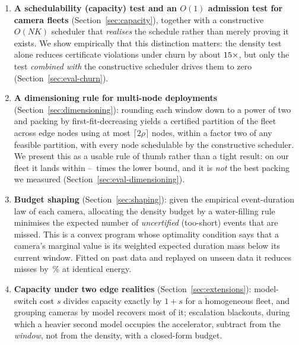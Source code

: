 \documentclass[final,5p,times,twocolumn]{elsarticle}
\theoremstyle{definition}
\newcommand{\Nc}{N}
\newcommand{\dens}{\rho}
\begin{document}
\begin{enumerate}
\item \textbf{A schedulability (capacity) test and an $O(1)$ admission test for camera fleets}
      (Section~\ref{sec:capacity}), together with a constructive $O(\Nc K)$ scheduler that
      \emph{realises} the schedule rather than merely proving it exists. We show empirically that
      this distinction matters: the density test alone reduces certificate violations under churn
      by about $15\times$, but only the test \emph{combined with} the constructive
      scheduler drives them to zero (Section~\ref{sec:eval-churn}).
\item \textbf{A dimensioning rule for multi-node deployments} (Section~\ref{sec:dimensioning}):
      rounding each window down to a power of two and packing by first-fit-decreasing yields a
      certified partition of the fleet across edge nodes using at most $\lceil 2\dens\rceil$
      nodes, within a factor two of any feasible partition, with every node schedulable by the
      constructive scheduler. We present this as a usable rule of thumb rather than a tight
      result: on our fleet it lands within
      \numEfourCorThreeRatioMin--\numEfourCorThreeRatioMax\ times the lower bound, and it is
      \emph{not} the best packing we measured (Section~\ref{sec:eval-dimensioning}).
\item \textbf{Budget shaping} (Section~\ref{sec:shaping}): given the empirical event-duration law
      of each camera, allocating the density budget by a water-filling rule minimises the expected
      number of \emph{uncertified} (too-short) events that are missed. This is a convex program
      whose optimality condition says that a camera's marginal value is its weighted expected
      duration mass below its current window. Fitted on past data and replayed on unseen data it
      reduces misses by \numHoldoutGain\,\% at identical energy.
\item \textbf{Capacity under two edge realities} (Section~\ref{sec:extensions}): model-switch cost
      $s$ divides capacity exactly by $1+s$ for a homogeneous fleet, and grouping cameras by model
      recovers most of it; escalation blackouts, during which a heavier second model occupies the
      accelerator, subtract from the \emph{window}, not from the density, with a closed-form
      budget.
\end{enumerate}
\end{document}
